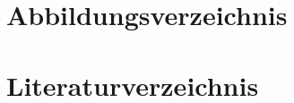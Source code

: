 \documentclass[12pt,a4paper,ngerman,captions=tableheading]{scrartcl}
\begin{document}
%




\newpage
\section{Abbildungsverzeichnis}






\section{Literaturverzeichnis}






%
%


\newpage
\end{document}
